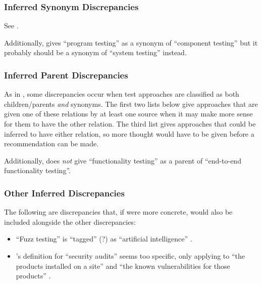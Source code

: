     \subsubsection{Inferred Synonym Discrepancies}
    See .

    \begin{enumerate}
        
    \end{enumerate}

    Additionally, \citet[p.~46]{Kam2008} gives ``program testing'' as a synonym
    of ``component testing'' but it probably should be a synonym of ``system
    testing'' instead.

    \subsubsection{Inferred Parent Discrepancies}
    As in , some discrepancies occur when test approaches
    are classified as both children/parents \emph{and} synonyms. The first two
    lists below give approaches that are given one of these relations by at
    least one source when it may make more sense for them to have the other
    relation. The third list gives approaches that could be inferred to have
    either relation, so more thought would have to be given before a
    recommendation can be made.

    

    Additionally, \citep[Tab.~2]{Gerrard2000a} does \emph{not} give
    ``functionality testing'' as a parent of ``end-to-end functionality testing''.

    \subsubsection{Other Inferred Discrepancies}
    The following are discrepancies that, if were more concrete, would also be
    included alongside the other discrepancies:
    \begin{itemize}
        \item ``Fuzz testing'' is ``tagged'' (?) as ``artificial
              intelligence'' \citep[p.~5]{IEEE2022}.
        \item \citeauthor{Gerrard2000b}'s definition for ``security
              audits'' seems too specific, only applying to ``the products
              installed on a site'' and ``the known vulnerabilities for
              those products'' \citeyearpar[p.~28]{Gerrard2000b}.
    \end{itemize}
\fi